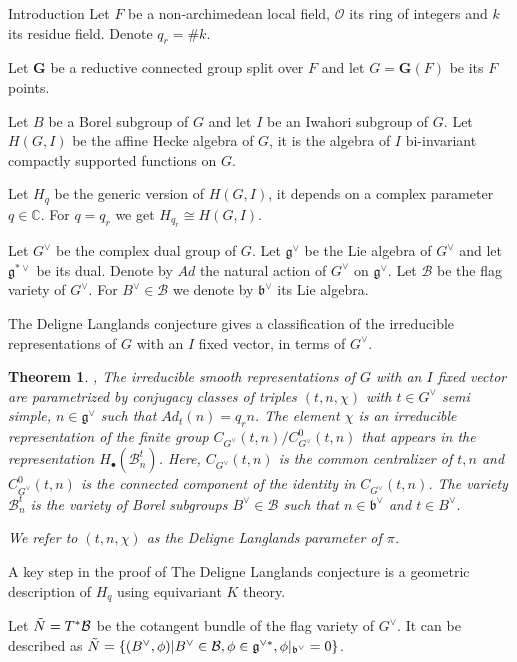 \documentclass[12pt]{article}
\newcommand{\B}{\mathcal{B}}
\newcommand{\C}{\mathbb{C}}
\newcommand{\s}{\mathcal{O}}
\newcommand{\<}{\langle}
\renewcommand{\>}{\rangle}
\theoremstyle{plain}
\newtheorem{theorem}{Theorem}[section]
\theoremstyle{definition}
\begin{document}
\begin{section}{Introduction}
Let $F$ be a non-archimedean local field, $\s$ its ring of integers and $k$ its residue field. Denote $q_r=\#k$.

Let $\mathbf{G}$ be a reductive connected group split over $F$ and let $G=\mathbf{G}(F)$ be its $F$ points.

Let $B$ be a Borel subgroup of $G$ and let $I$ be an Iwahori subgroup of $G$. Let $H(G,I)$ be the affine Hecke algebra of $G$, it is the algebra of $I$ bi-invariant compactly supported functions on $G$. 

Let $H_q$ be the generic version of $H(G,I)$, it depends on a complex parameter $q\in\C$. For $q=q_r$ we get $H_{q_r}\cong H(G,I)$.


Let $G^\vee$ be the complex dual group of $G$. Let $\mathfrak{g}^\vee$ be the Lie algebra of $G^\vee$ and let $\mathfrak{g}^{*\vee}$ be its dual. Denote by $Ad$ the natural action of $G^\vee$ on $\mathfrak{g}^{\vee}$. Let $\B$ be the flag variety of $G^\vee$. For $B^\vee\in\B$ we denote by $\mathfrak{b}^\vee$ its Lie algebra.

The Deligne Langlands conjecture gives a classification of the irreducible representations of $G$ with an $I$ fixed vector, in terms of $G^\vee$. 

\begin{theorem}{\cite{Kazhdan1987ProofOT},\cite{reeder}} \label{DL conjecture}The irreducible smooth representations of $G$ with an $I$ fixed vector are parametrized by conjugacy classes of triples $(t,n,\chi)$ with $t\in G^\vee$ semi simple, $n\in \mathfrak{g}^{\vee}$ such that $Ad_t(n)=q_rn$. The element $\chi$ is an irreducible representation of the finite group $C_{G^\vee}(t,n)/C^0_{G^\vee}(t,n)$ that appears in the representation $H_\bullet(\B_n^t)$. Here, $C_{G^\vee}(t,n)$ is the common centralizer of $t,n$ and $C^0_{G^\vee}(t,n)$ is the connected component of the identity in $C_{G^\vee}(t,n)$. The variety $\B_n^t$ is the variety of Borel subgroups $B^\vee\in\B$ such that $n\in \mathfrak{b}^\vee$ and $t\in B^\vee$.

We refer to $(t,n,\chi)$ as the Deligne Langlands parameter of $\pi$.
    
\end{theorem}


A key step in the proof of The Deligne Langlands conjecture is a geometric description of $H_q$ using equivariant $K$ theory. 


 Let $\Tilde{N}=T^*\B$ be the cotangent bundle of the flag variety of $G^\vee$. It can be described as  $\Tilde{N}=\{(B^\vee,\phi)|B^\vee\in\B,\phi\in \mathfrak{g}^{\vee*}, \phi|_{\mathfrak{b}^\vee}=0\}$.
 

\end{section}
\end{document}
